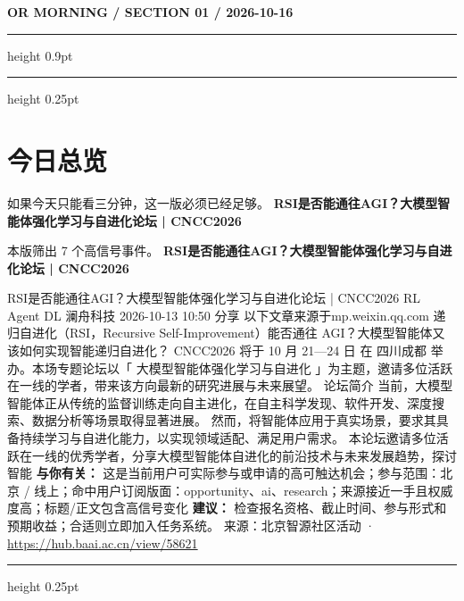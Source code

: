 \documentclass[10.5pt]{ctexart}
\begin{document}
{\small\bfseries OR MORNING / SECTION 01 / 2026-10-16}
\vspace{2mm}
\hrule height 0.9pt
\vspace{1.5mm}
\hrule height 0.25pt
\vspace{4mm}
\section*{今日总览}
{\color{ormuted} 如果今天只能看三分钟，这一版必须已经足够。}
\vspace{2mm}
{\fontsize{25}{29}\selectfont\bfseries RSI是否能通往AGI？大模型智能体强化学习与自进化论坛 | CNCC2026}\par
\vspace{2mm}
{\large 本版筛出 7 个高信号事件。}
\vspace{3mm}
{\Large\bfseries RSI是否能通往AGI？大模型智能体强化学习与自进化论坛 | CNCC2026}\par
RSI是否能通往AGI？大模型智能体强化学习与自进化论坛 | CNCC2026 RL Agent DL 澜舟科技 2026-10-13 10:50 分享 以下文章来源于mp.weixin.qq.com 递归自进化（RSI，Recursive Self-Improvement）能否通往 AGI？大模型智能体又该如何实现智能递归自进化？ CNCC2026 将于 10 月 21—24 日 在 四川成都 举办。本场专题论坛以「 大模型智能体强化学习与自进化 」为主题，邀请多位活跃在一线的学者，带来该方向最新的研究进展与未来展望。 论坛简介 当前，大模型智能体正从传统的监督训练走向自主进化，在自主科学发现、软件开发、深度搜索、数据分析等场景取得显著进展。 然而，将智能体应用于真实场景，要求其具备持续学习与自进化能力，以实现领域适配、满足用户需求。 本论坛邀请多位活跃在一线的优秀学者，分享大模型智能体自进化的前沿技术与未来发展趋势，探讨智能
\textbf{与你有关：} 这是当前用户可实际参与或申请的高可触达机会；参与范围：北京 / 线上；命中用户订阅版面：opportunity、ai、research；来源接近一手且权威度高；标题/正文包含高信号变化
\textbf{建议：} 检查报名资格、截止时间、参与形式和预期收益；合适则立即加入任务系统。
{\footnotesize\color{ormuted} 来源：北京智源社区活动 · \url{https://hub.baai.ac.cn/view/58621}}
\vspace{3mm}
\hrule height 0.25pt
\vspace{3mm}
\end{document}
